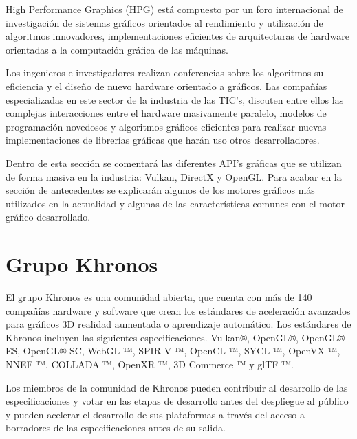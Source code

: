 \documentclass[a4paper, 17pt]{book}
\begin{document}
High Performance Graphics (HPG) está compuesto por un foro internacional de investigación de sistemas gráficos
orientados al rendimiento y utilización de algoritmos innovadores, implementaciones eficientes de arquitecturas
de hardware orientadas a la computación gráfica de las máquinas. 

\vspace{1mm} %

Los ingenieros e investigadores realizan conferencias sobre los algoritmos su eficiencia y el diseño de nuevo
hardware orientado a gráficos. Las compañías especializadas en este sector de la industria de las TIC’s, discuten
entre ellos las complejas interacciones entre el hardware masivamente paralelo, modelos de programación novedosos
y algoritmos gráficos eficientes para realizar nuevas implementaciones de librerías gráficas que harán uso otros
desarrolladores.

\vspace{1mm} %

Dentro de esta sección se comentará las diferentes API’s gráficas que se utilizan de forma masiva en la industria:
Vulkan, DirectX y OpenGL. Para acabar en la sección de antecedentes se explicarán algunos de los motores gráficos
más utilizados en la actualidad y algunas de las características comunes con el motor gráfico desarrollado.

\section{Grupo Khronos} 
\label{sec:Grupo Khronos}

El grupo Khronos es una comunidad abierta, que cuenta con más de 140 compañías hardware y software que crean los estándares de
aceleración avanzados para gráficos 3D realidad aumentada o aprendizaje automático. Los estándares de Khronos incluyen las
siguientes especificaciones.  Vulkan®, OpenGL®, OpenGL® ES, OpenGL® SC, WebGL ™, SPIR-V ™, OpenCL ™, SYCL ™, OpenVX ™,
NNEF ™, COLLADA ™, OpenXR ™, 3D Commerce ™ y glTF ™. 

\vspace{1mm} %

Los miembros de la comunidad de Khronos pueden contribuir al desarrollo de las especificaciones y votar en las etapas de
desarrollo antes del despliegue al público y pueden acelerar el desarrollo de sus plataformas a través del acceso a
borradores de las especificaciones antes de su salida.
\end{document}
